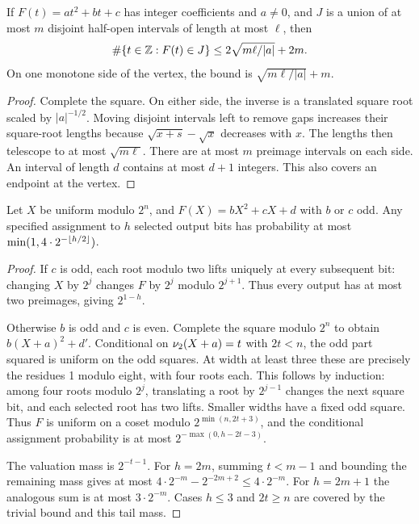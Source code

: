 \begin{lemma}\label{lem:interval}
If $F(t)=at^2+bt+c$ has integer coefficients and $a\ne0$, and $J$ is a union of at most $m$ disjoint half-open intervals of length at most $\ell$, then
\[
 \#\{t\in\mathbb Z:F(t)\in J\}\le2\sqrt{m\ell/|a|}+2m.
\]
On one monotone side of the vertex, the bound is $\sqrt{m\ell/|a|}+m$.
\end{lemma}
\begin{proof}
Complete the square. On either side, the inverse is a translated square root scaled by $|a|^{-1/2}$. Moving disjoint intervals left to remove gaps increases their square-root lengths because $\sqrt{x+s}-\sqrt x$ decreases with $x$. The lengths then telescope to at most $\sqrt{m\ell}$. There are at most $m$ preimage intervals on each side. An interval of length $d$ contains at most $d+1$ integers. This also covers an endpoint at the vertex.
\end{proof}

\begin{lemma}\label{lem:modquad}
Let $X$ be uniform modulo $2^n$, and $F(X)=bX^2+cX+d$ with $b$ or $c$ odd. Any specified assignment to $h$ selected output bits has probability at most $\min(1,4\cdot2^{-\left\lfloor h/2\right\rfloor})$.
\end{lemma}
\begin{proof}
If $c$ is odd, each root modulo two lifts uniquely at every subsequent bit: changing $X$ by $2^j$ changes $F$ by $2^j$ modulo $2^{j+1}$. Thus every output has at most two preimages, giving $2^{1-h}$.

Otherwise $b$ is odd and $c$ is even. Complete the square modulo $2^n$ to obtain $b(X+a)^2+d'$. Conditional on $\nu_2(X+a)=t$ with $2t<n$, the odd part squared is uniform on the odd squares. At width at least three these are precisely the residues 1 modulo eight, with four roots each. This follows by induction: among four roots modulo $2^j$, translating a root by $2^{j-1}$ changes the next square bit, and each selected root has two lifts. Smaller widths have a fixed odd square. Thus $F$ is uniform on a coset modulo $2^{\min(n,2t+3)}$, and the conditional assignment probability is at most $2^{-\max(0,h-2t-3)}$.

The valuation mass is $2^{-t-1}$. For $h=2m$, summing $t<m-1$ and bounding the remaining mass gives at most $4\cdot2^{-m}-2^{-2m+2}\le4\cdot2^{-m}$. For $h=2m+1$ the analogous sum is at most $3\cdot2^{-m}$. Cases $h\le3$ and $2t\ge n$ are covered by the trivial bound and this tail mass.
\end{proof}

